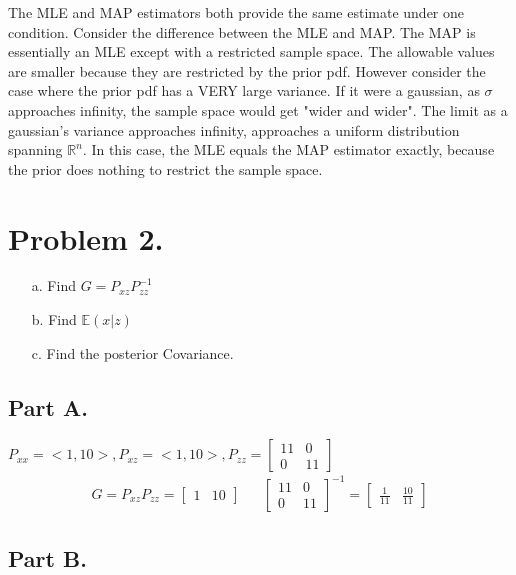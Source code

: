 \documentclass{article}
\begin{document}
The MLE and MAP estimators both provide the same estimate under one condition. Consider the difference between the MLE and MAP. The MAP is essentially an MLE except with a restricted sample space. The allowable values are smaller because they are restricted by the prior pdf. However consider the case where the prior pdf has a VERY large variance. If it were a gaussian, as $\sigma$ approaches infinity, the sample space would get "wider and wider". The limit as a gaussian's variance approaches infinity, approaches a uniform distribution spanning $\mathbb{R}^n$. In this case, the MLE equals the MAP estimator exactly, because the prior does nothing to restrict the sample space.
\clearpage
\section*{Problem 2.}
\begin{enumerate}
\item[a.] Find $G=P_{xz}P_{zz}^{-1}$
\item[b.] Find $\mathbb{E}(x|z)$
\item[c.] Find the posterior Covariance.
\end{enumerate}
\subsection*{Part A.}
$P_{xx} = <1,10>, P_{xz} = <1,10>, P_{zz} = \begin{bmatrix}
                                        11 & 0 \\
                                         0 & 11
                                        \end{bmatrix}$
\begin{align*}
G = P_{xz} P_{zz} = \begin{bmatrix}     1 & 10 
                                        \end{bmatrix} && \begin{bmatrix}
                                        11 & 0 \\
                                         0 & 11
                                        \end{bmatrix}^{-1} = \begin{bmatrix}
                                        \frac{1}{11} & \frac{10}{11}
                                        \end{bmatrix}
\end{align*}

\subsection*{Part B.}
\end{document}
